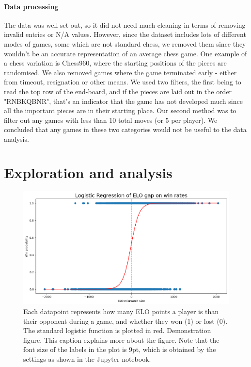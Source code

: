 \documentclass[11pt,a4paper]{article}
\begin{document}
\paragraph{Data processing}
The data was well set out, so it did not need much cleaning in terms of removing invalid entries or N/A values. However, since the dataset includes lots of different modes of games, some which are not standard chess, we removed them since they wouldn't be an accurate representation of an average chess game. One example of a chess variation is Chess960, where the starting positions of the pieces are randomised.
We also removed games where the game terminated early - either from timeout, resignation or other means. We used two filters, the first being to read the top row of the end-board, and if the pieces are laid out in the order "RNBKQBNR", that's an indicator that the game has not developed much since all the important pieces are in their starting place. Our second method was to filter out any games with less than 10 total moves (or 5 per player). We concluded that any games in these two categories would not be useful to the data analysis.

\section{Exploration and  analysis}

\begin{figure}[t]
  \centering
  \includegraphics{report/images/log_regression.png}
  \caption{Each datapoint represents how many ELO points a player is than their opponent during a game, and whether they won (1) or lost (0). The standard logistic function is plotted in red.
  Demonstration figure. This caption explains more about the figure. Note that the font size of the labels in the plot is 9pt, which is obtained by the settings as shown in the Jupyter notebook.}
  \label{fds-project-template:fig:log_regression}
\end{figure}
\end{document}
